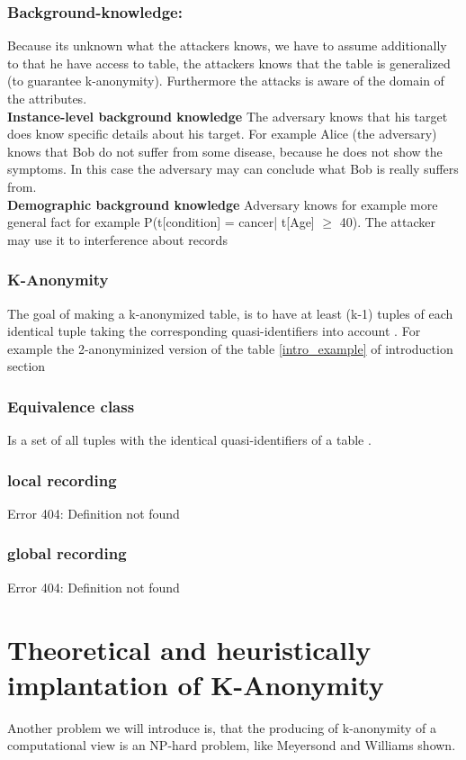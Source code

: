 \documentclass{llncs}
\begin{document}
\subsubsection{Background-knowledge:}
Because its unknown what the attackers knows, we have to assume additionally to that he have access to table, the attackers knows that the table is generalized (to guarantee k-anonymity). Furthermore the attacks is aware of the domain of the attributes.\\
\textbf{Instance-level background knowledge}
The adversary knows that his target does know specific details about his target. For example Alice (the adversary) knows that Bob do not suffer from some disease, because he does not show the symptoms. In this case the adversary may can conclude what Bob is really suffers from.\\
\textbf{Demographic background knowledge}
Adversary knows for example more general fact for example P(t[condition] = cancer| t[Age] $\geq$ 40). The attacker may use it to interference about records \cite{ldiversity}

\subsubsection{K-Anonymity}
The goal of making a k-anonymized table, is to have at least (k-1) tuples of each identical tuple taking the corresponding quasi-identifiers into account \cite{sweeney2002k,li2006achieving}. For example the 2-anonyminized version of the table \ref{intro_example} of introduction section
\subsubsection{Equivalence class}
Is a set of all tuples with the identical quasi-identifiers of a table \cite{li2006achieving}.
\subsubsection{local recording}
Error 404: Definition not found
\subsubsection{global recording}
Error 404: Definition not found
\section{Theoretical and heuristically implantation of K-Anonymity}
Another problem we will introduce is, that the producing of k-anonymity of a computational view is an NP-hard problem, like Meyersond and Williams shown.
 
\end{document}

